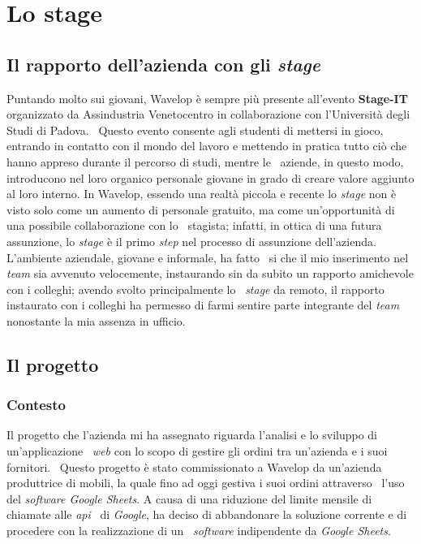 
\chapter{Lo stage}
\label{cap:stage}
\section{Il rapporto dell'azienda con gli \emph{stage}}
Puntando molto sui giovani, Wavelop è sempre più presente all'evento \textbf{Stage-IT} organizzato da Assindustria Venetocentro in collaborazione con l'Università degli Studi di Padova. \
Questo evento consente agli studenti di mettersi in gioco, entrando in contatto con il mondo del lavoro e mettendo in pratica tutto ciò che hanno appreso durante il percorso di studi, mentre le \
aziende, in questo modo, introducono nel loro organico personale giovane in grado di creare valore aggiunto al loro interno.
In Wavelop, essendo una realtà piccola e recente lo \emph{stage} non è visto solo come un aumento di personale gratuito, ma come un'opportunità di una possibile collaborazione con lo \
stagista; infatti, in ottica di una futura assunzione, lo \emph{stage} è il primo \emph{step} nel processo di assunzione dell'azienda. L'ambiente aziendale, giovane e informale, ha fatto \
si che il mio inserimento nel \emph{team} sia avvenuto velocemente, instaurando sin da subito un rapporto amichevole con i colleghi; avendo svolto principalmente lo \
\emph{stage} da remoto, il rapporto instaurato con i colleghi ha permesso di farmi sentire parte integrante del \emph{team} nonostante la mia assenza in ufficio.

\section{Il progetto}

\subsection{Contesto}
Il progetto che l'azienda mi ha assegnato riguarda l'analisi e lo sviluppo di un'applicazione \
\emph{web} con lo scopo di gestire gli ordini tra un'azienda e i suoi fornitori. \ 
Questo progetto è stato commissionato a Wavelop da un'azienda produttrice di mobili, la quale fino ad oggi gestiva i suoi ordini attraverso \
l'uso del \emph{software Google Sheets}. A causa di una riduzione del limite mensile di chiamate alle \emph{\acrshort{api}} \
di \emph{Google}, ha deciso di abbandonare la soluzione corrente e di procedere con la realizzazione di un \
\emph{software} indipendente da \emph{Google Sheets}. \\

